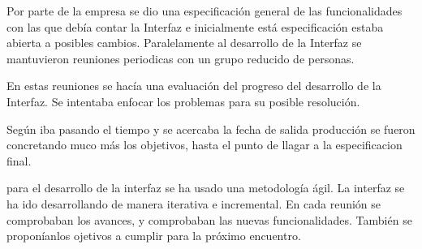 Por parte de la empresa se dio una especificación general de las funcionalidades con las que debía contar la Interfaz e inicialmente está  especificación  estaba abierta a posibles cambios. Paralelamente al desarrollo de la Interfaz se mantuvieron reuniones periodicas con un grupo reducido de personas.

En estas reuniones se hacía una evaluación del progreso del desarrollo de la Interfaz. Se intentaba enfocar los problemas para su posible resolución.

Según iba pasando el tiempo y se acercaba la fecha de salida producción se fueron concretando muco más los objetivos, hasta el punto de llagar a la especificacion final.


para el desarrollo de la interfaz se ha usado una metodología ágil. La interfaz se ha ido desarrollando de manera iterativa e incremental. 
En cada reunión se comprobaban los avances, y comprobaban las nuevas funcionalidades.
 También se proponíanlos ojetivos a cumplir para la próximo encuentro.